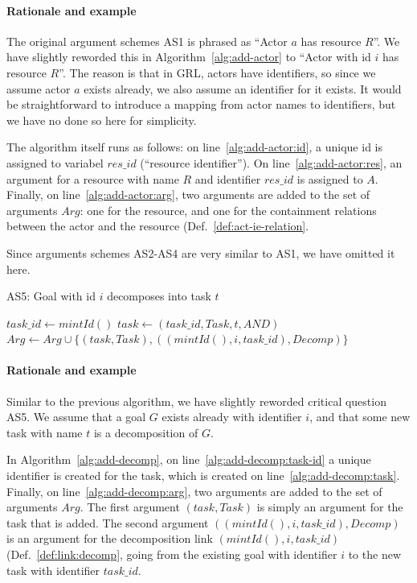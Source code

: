 \paragraph{Rationale and example} The original argument schemes AS1 is phrased as ``Actor $a$ has resource $R$''. We have slightly reworded this in Algorithm~\ref{alg:add-actor} to ``Actor with id $i$ has resource $R$''. The reason is that in GRL, actors have identifiers, so since we assume actor $a$ exists already, we also assume an identifier for it exists. It would be straightforward to introduce a mapping from actor names to identifiers, but we have no done so here for simplicity. 

The algorithm itself runs as follows: on line~\ref{alg:add-actor:id}, a unique id is assigned to variabel $res\_id$ (``resource identifier''). On line~\ref{alg:add-actor:res}, an argument for a resource with name $R$ and identifier $res\_id$ is assigned to $A$. Finally, on line~\ref{alg:add-actor:arg}, two arguments are added to the set of arguments $Arg$: one for the resource, and one for the containment relations between the actor and the resource (Def.~\ref{def:act-ie-relation}.

Since arguments schemes AS2-AS4 are very similar to AS1, we have omitted it here.

\begin{algorithm}[h]
  \caption{AS5: Goal with id $i$ decomposes into task $t$}\label{alg:add-decomp}
  \begin{algorithmic}[1]
    \State $task\_id\gets mintId()$\label{alg:add-decomp:task-id}
    \State $task\leftarrow (task\_id, Task, t, AND)$\label{alg:add-decomp:task}
    \State $Arg\gets Arg\cup \{(task, Task),((mintId(),i,task\_id), Decomp)\}$\label{alg:add-decomp:arg}
    \EndProcedure
  \end{algorithmic}
\end{algorithm}

\paragraph{Rationale and example} Similar to the previous algorithm, we have slightly reworded critical question AS5. We assume that a goal $G$ exists already with identifier $i$, and that some new task with name $t$ is a decomposition of $G$. 

In Algorithm~\ref{alg:add-decomp}, on line~\ref{alg:add-decomp:task-id} a unique identifier is created for the task, which is created on line~\ref{alg:add-decomp:task}. Finally, on line~\ref{alg:add-decomp:arg}, two arguments are added to the set of arguments $Arg$. The first argument $(task,Task)$ is simply an argument for the task that is added. The second argument $((mintId(),i,task\_id),Decomp)$ is an argument for the decomposition link $(mintId(), i, task\_id)$ (Def.~\ref{def:link:decomp}, going from the existing goal with identifier $i$ to the new task with identifier $task\_id$.

